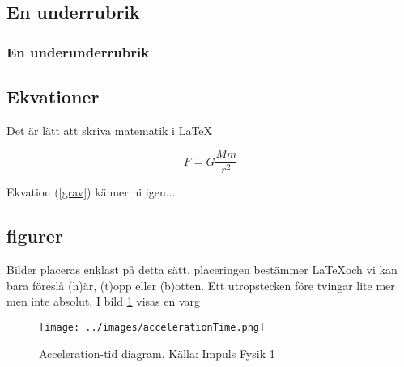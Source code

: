 \documentclass[11p]{article}
\begin{document}
    \subsection{En underrubrik}
    \subsubsection{En underunderrubrik}
    \subsection{Ekvationer}
    Det är lätt att skriva matematik i \LaTeX

    \begin{equation}
        F = G \frac{M m}{r^2}
        \label{grav}
    \end{equation}

    Ekvation (\ref{grav}) känner ni igen...

    \subsection{figurer}
    Bilder placeras enklast på detta sätt. placeringen bestämmer \LaTeX och vi kan bara föreslå (h)är, (t)opp eller (b)otten. Ett utropstecken före tvingar lite mer men inte absolut. I bild \ref{varg} visas en varg
    \begin{figure}[!h]
        \texttt{[image: ../images/accelerationTime.png]}
        \caption{Acceleration-tid diagram. Källa: Impuls Fysik 1}
        \label{varg}
    \end{figure}
    \printbibliography
\end{document}
